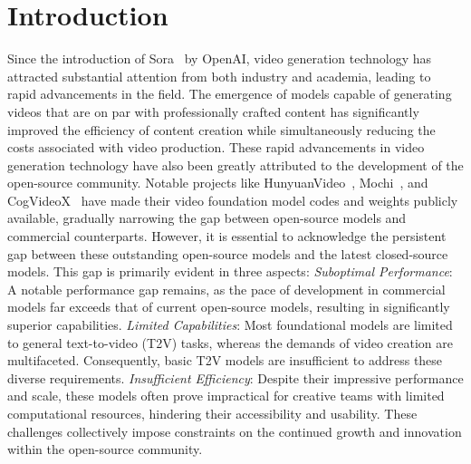 
\section{Introduction}
\label{sec:intro}

Since the introduction of Sora~\citep{openaisora2024} by OpenAI, video generation technology has attracted substantial attention from both industry and academia, leading to rapid advancements in the field.
%
The emergence of models capable of generating videos that are on par with professionally crafted content has significantly improved the efficiency of content creation while simultaneously reducing the costs associated with video production.
%
These rapid advancements in video generation technology have also been greatly attributed to the development of the open-source community.
%
Notable projects like HunyuanVideo~\citep{kong2024hunyuanvideo}, Mochi~\citep{genmo2024mochi}, and CogVideoX~\citep{cogvideox} have made their video foundation model codes and weights publicly available, gradually narrowing the gap between open-source models and commercial counterparts.
%
However, it is essential to acknowledge the persistent gap between these outstanding open-source models and the latest closed-source models. 
%
This gap is primarily evident in three aspects:
%
\emph{Suboptimal Performance}: A notable performance gap remains, as the pace of development in commercial models far exceeds that of current open-source models, resulting in significantly superior capabilities.
%
\emph{Limited Capabilities}: Most foundational models are limited to general text-to-video (T2V) tasks, whereas the demands of video creation are multifaceted. Consequently, basic T2V models are insufficient to address these diverse requirements.
%
\emph{Insufficient Efficiency}: Despite their impressive performance and scale, these models often prove impractical for creative teams with limited computational resources, hindering their accessibility and usability.
%
These challenges collectively impose constraints on the continued growth and innovation within the open-source community.


